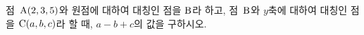점~$\mathrm{A}(2{,}\mkern3mu\mathopen{}3{,}\mkern3mu\mathopen{}5)$와 원점에 대하여 대칭인 점을 $\mathrm{B}$라 하고, 점~$\mathrm{B}$와 $y$축에 대하여 대칭인 점을 $\mathrm{C}(a{,}\mkern3mu\mathopen{}b{,}\mkern3mu\mathopen{}c)$라 할 때, $a-b+c$의 값을 구하시오.
